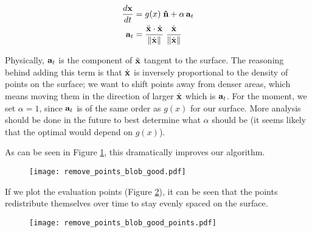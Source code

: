 \begin{align}
  \label{eq:erosion-diff-eq-2}
  \frac{d\bvec{x}}{dt}& = g(x) \; \bhat{n} + \alpha \, \bvec{a}_t\\
  \bvec{a}_t& = \frac{\ddot{\bvec{x}} \cdot \dot{\bvec{x}}}{\norm{\dot{\bvec{x}}}} \; \frac{\dot{\bvec{x}}}{\norm{\dot{\bvec{x}}}}
\end{align}

Physically, $\mathbf{a}_t$ is the component of $\ddot{\mathbf{x}}$ tangent to the surface. The reasoning behind adding this term is that $\dot{\mathbf{x}}$ is inversely proportional to the density of points on the surface; we want to shift points away from denser areas, which means moving them in the direction of larger $\dot{\mathbf{x}}$ which is $\mathbf{a}_t$. For the moment, we set $\alpha = 1$, since $\mathbf{a}_t$ is of the same order as $g(x)$ for our surface. More analysis should be done in the future to best determine what $\alpha$ should be (it seems likely that the optimal would depend on $g(x)$). 

As can be seen in Figure \ref{fig:remove-points-blob-good}, this dramatically improves our algorithm.

\begin{figure}[H]
    \begin{center}
      \texttt{[image: remove\_points\_blob\_good.pdf]}
    \end{center}
  \vspace{-.2in} %
  \caption{\label{fig:remove-points-blob-good}}
\end{figure}

If we plot the evaluation points (Figure \ref{fig:remove-points-blob-good-points}), it can be seen that the points redistribute themselves over time to stay evenly spaced on the surface.

\begin{figure}[H]
    \begin{center}
      \texttt{[image: remove\_points\_blob\_good\_points.pdf]}
    \end{center}
  \vspace{-.2in} %
  \caption{\label{fig:remove-points-blob-good-points}}
\end{figure}